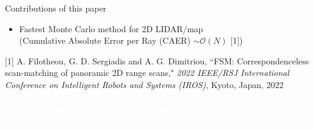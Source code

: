 \begin{frame}[noframenumbering]{Contributions of this paper}

  \begin{overlayarea}{\textwidth}{3cm}
  \leavevmode
    \begin{itemize}
      \item Fastest Monte Carlo method for 2D LIDAR/map \\
         (Cumulative Absolute Error per Ray (CAER) $\sim \mathcal{O}(N)$ [1])
    \end{itemize}


  \end{overlayarea}
  \placebottom \vspace{-1.0cm} \tiny {[1] A. Filotheou, G. D. Sergiadis and A. G. Dimitriou, ``FSM: Correspondenceless scan-matching of panoramic 2D range scans," \textit{2022 IEEE/RSJ International Conference on Intelligent Robots and Systems (IROS)}, Kyoto, Japan, 2022} \\ \textcolor{white}{[2] A. Filotheou, A. L. Symeonidis, G. D. Sergiadis, and A. G. Dimitriou, ``Correspondenceless scan-to-map-scan matching of 2D panoramic range scans", Array, 2023}

\end{frame}
